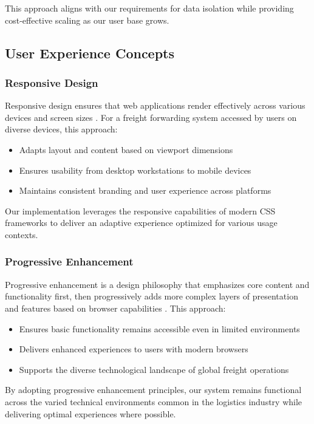 This approach aligns with our requirements for data isolation while providing cost-effective scaling as our user base grows.

\subsection{User Experience Concepts}
\subsubsection{Responsive Design}
Responsive design ensures that web applications render effectively across various devices and screen sizes \cite{marcotte2011responsive}. For a freight forwarding system accessed by users on diverse devices, this approach:

\begin{itemize}
    \item Adapts layout and content based on viewport dimensions
    \item Ensures usability from desktop workstations to mobile devices
    \item Maintains consistent branding and user experience across platforms
\end{itemize}

Our implementation leverages the responsive capabilities of modern CSS frameworks to deliver an adaptive experience optimized for various usage contexts.

\subsubsection{Progressive Enhancement}
Progressive enhancement is a design philosophy that emphasizes core content and functionality first, then progressively adds more complex layers of presentation and features based on browser capabilities \cite{developer_mozilla}. This approach:

\begin{itemize}
    \item Ensures basic functionality remains accessible even in limited environments
    \item Delivers enhanced experiences to users with modern browsers
    \item Supports the diverse technological landscape of global freight operations
\end{itemize}

By adopting progressive enhancement principles, our system remains functional across the varied technical environments common in the logistics industry while delivering optimal experiences where possible.

